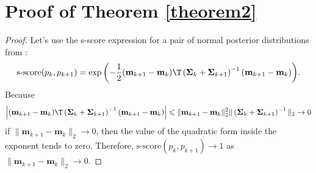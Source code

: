 \documentclass[runningheads]{llncs}
\begin{document}
\section{Proof of Theorem \ref{theorem2}}
\begin{proof}
Let's use the s-score expression for a pair of normal posterior distributions from \cite{Aduenko2017}:
\[\text{s-score}(p_k, p_{k+1}) = \exp{\left( -\dfrac{1}{2} (\mathbf{m}_{k+1} - \mathbf{m}_k)\T \left( \mathbf{\Sigma}_k + \mathbf{\Sigma}_{k+1} \right)^{-1} (\mathbf{m}_{k+1} - \mathbf{m}_k) \right)}. \]
Because
    \[ \left| (\mathbf{m}_{k+1} - \mathbf{m}_k)\T \left( \mathbf{\Sigma}_k + \mathbf{\Sigma}_{k+1} \right)^{-1} (\mathbf{m}_{k+1} - \mathbf{m}_k) \right| \leqslant \| \mathbf{m}_{k+1} - \mathbf{m}_k \|_2^2 \| \left( \mathbf{\Sigma}_k + \mathbf{\Sigma}_{k+1} \right)^{-1} \|_2 \to 0 \]
    if $\|\mathbf{m}_{k+1} - \mathbf{m}_k\|_2\to 0$, then the value of the quadratic form inside the exponent tends to zero. Therefore, $\text{s-score}(p_k, p_{k+1}) \to 1$ as $\|\mathbf{m}_{k+1} - \mathbf{m}_k\|_2\to 0$.
\end{proof}
\end{document}
